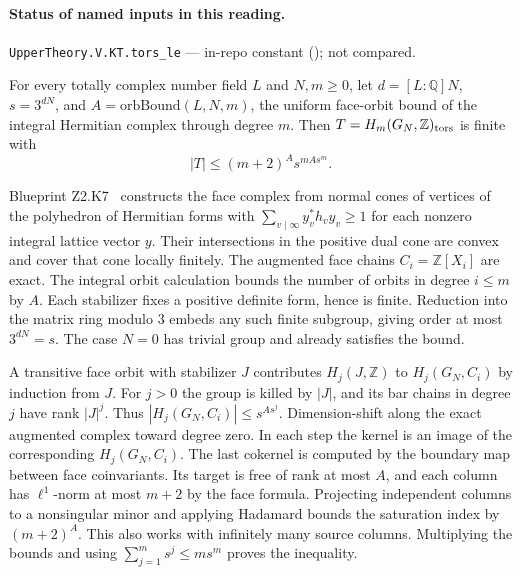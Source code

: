 

\paragraph{Status of named inputs in this reading.}
\noindent\nolinkurl{UpperTheory.V.KT.tors_le} --- in-repo constant (); not compared.\par

\begin{formalstatement}\label{pn:P038}
For every totally complex number field \(L\) and \(N,m\ge0\), let
\(d=[L:\mathbb Q]N\), \(s=3^{dN}\), and \(A=\mathrm{orbBound}(L,N,m)\),
the uniform face-orbit bound of the integral Hermitian complex through
degree \(m\). Then \(T=H_m(G_N,\mathbb Z)_{\rm tors}\) is finite with
\[
                    |T|\le(m+2)^A s^{m A s^m}.
\]
\end{formalstatement}
\begin{outline}
Blueprint Z2.K7~ constructs the face complex from normal cones of
vertices of the polyhedron of Hermitian forms with
\(\sum_{v\mid\infty} y_v^*h_v y_v\ge1\) for each nonzero integral
lattice vector \(y\). Their intersections in the positive dual
cone are convex and cover that cone locally finitely. The augmented
face chains \(C_i=\mathbb Z[X_i]\) are exact. The integral orbit
calculation bounds the number of orbits in degree \(i\le m\) by \(A\).
Each stabilizer fixes a positive definite form, hence is finite.
Reduction into the matrix ring modulo 3 embeds any such finite
subgroup, giving order at most \(3^{dN}=s\). The case \(N=0\) has
trivial group and already satisfies the bound.

A transitive face orbit with stabilizer \(J\) contributes \(H_j(J,\mathbb Z)\)
to \(H_j(G_N,C_i)\) by induction from \(J\). For \(j>0\) the group
is killed by \(|J|\), and its bar chains in degree \(j\) have rank
\(|J|^j\). Thus \(|H_j(G_N,C_i)|\le s^{As^j}\). Dimension-shift
along the exact augmented complex toward degree zero. In each step
the kernel is an image of the corresponding \(H_j(G_N,C_i)\).
The last cokernel is computed by the boundary map between face
coinvariants. Its target is free of rank at most \(A\), and each
column has \(\ell^1\)-norm at most \(m+2\) by the face formula.
Projecting independent columns to a nonsingular minor and applying
Hadamard bounds the saturation index by \((m+2)^A\). This also
works with infinitely many source columns. Multiplying the bounds
and using \(\sum_{j=1}^m s^j\le ms^m\) proves the inequality.
\end{outline}


